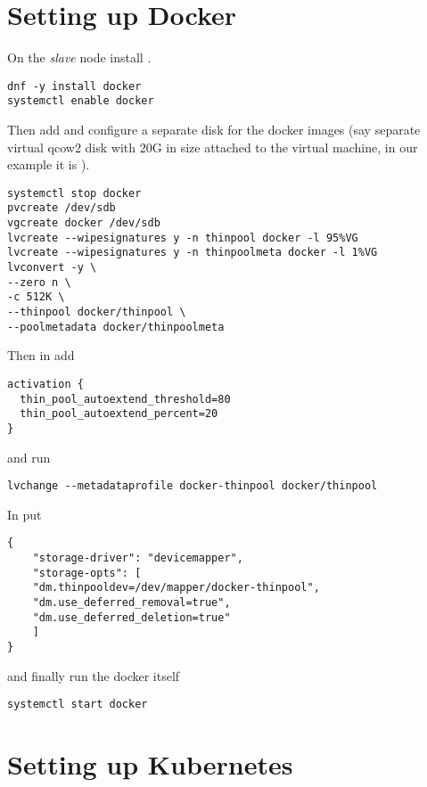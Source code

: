 \section{Setting up Docker}
\label{sec:setup-docker}

On the \emph{slave} node install .

\begin{lstlisting}
dnf -y install docker
systemctl enable docker
\end{lstlisting}

Then add and configure a separate disk for the docker images
(say separate virtual qcow2 disk with 20G in size attached to
the virtual machine, in our example it is ).

\begin{lstlisting}
systemctl stop docker
pvcreate /dev/sdb
vgcreate docker /dev/sdb
lvcreate --wipesignatures y -n thinpool docker -l 95%VG
lvcreate --wipesignatures y -n thinpoolmeta docker -l 1%VG
lvconvert -y \
--zero n \
-c 512K \
--thinpool docker/thinpool \
--poolmetadata docker/thinpoolmeta
\end{lstlisting}

Then in  add

\begin{lstlisting}
activation {
  thin_pool_autoextend_threshold=80
  thin_pool_autoextend_percent=20
}
\end{lstlisting}

and run

\begin{lstlisting}
lvchange --metadataprofile docker-thinpool docker/thinpool
\end{lstlisting}

In  put

\begin{lstlisting}
{
    "storage-driver": "devicemapper",
    "storage-opts": [
    "dm.thinpooldev=/dev/mapper/docker-thinpool",
    "dm.use_deferred_removal=true",
    "dm.use_deferred_deletion=true"
    ]
}
\end{lstlisting}

and finally run the docker itself

\begin{lstlisting}
systemctl start docker
\end{lstlisting}

\section{Setting up Kubernetes}
\label{sec:setup-kuber}

